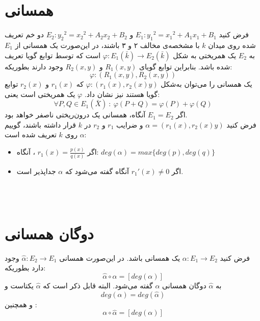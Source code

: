 \section{همسانی }
فرض کنید 
$E_1 : {y_1}^2 = {x_1}^2+A_1x_1+B_1$
و
$E_2 : {y_2}^2 = {x_2}^2+A_2x_2+B_2$
دو خم تعریف شده روی میدان
$k$
با مشخصه‌ی مخالف ۲ و ۳ باشند، در این‌صورت یک همسانی از
$E_1$
به
$E_2$
یک همریختی به شکل
$\varphi : E_1(\bar{k}) \longrightarrow E_2(\bar{k})$
است که توسط توابع گویا تعریف شده باشد. بنابراین توابع گویای 
$R_1(x,y)$
و
$R_2(x,y)$
وجود دارند بطوریکه:
$$ \varphi : (R_1(x,y), R_2(x,y)) $$
یک همسانی را می‌توان به‌شکل 
$\varphi : (r_1(x),r_2(x)y)$
که
$r_1(x)$
و
$r_2(x)$
توابع گویا هستند نیز نشان داد.
\remark
$\varphi$
یک همریختی است یعنی:
$$ \forall P,Q \in E_1(\bar{X}) ~:~ \varphi(P+Q)=\varphi(P)+ \varphi(Q) $$
\remark
اگر
$E_1=E_2$
آنگاه، همسانی یک درون‌ریختی ناصفر خواهد بود.
\\
فرض کنید 
$\alpha = (r_1(x), r_2(x)y)$
و ضرایب 
$r_1$
و
$r_2$
در
$k$
قرار داشته باشند، گوییم 
$\alpha$
روی
$k$
تعریف شده است:
\begin{itemize}
\item{
اگر 
$r_1(x) = \frac{p(x)}{q(x)}$
، آنگاه:
$ deg(\alpha) = max \{ deg(p), deg(q) \} $
}

\item{
اگر 
${r_1}'(x) \ne 0$
آنگاه گفته می‌شود که
$\alpha$
جداپذیر است.
}
\end{itemize}~
\\
\\
\section{دوگان همسانی}
\theorem 
فرض کنید 
$\alpha : E_1 \longrightarrow E_2$
یک همسانی باشد. در این‌صورت همسانی
$\hat{\alpha} : E_2 \longrightarrow E_1$
وجود دارد بطوریکه:
$$ \hat{\alpha} \circ  \alpha = [deg(\alpha)] $$
به 
$\hat{\alpha}$
دوگان همسانی
$\alpha$
گفته می‌شود. البته قابل ذکر است که
$\hat{\alpha}$
یکتاست و 
$$deg(\alpha) = deg(\hat{\alpha})$$
و همچنین :
$$ \alpha \circ \hat{\alpha} = [deg(\alpha)]$$
\\
